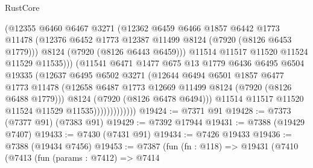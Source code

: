 \begin{lexlean}{RustCore}
\begin{coremodule}
                              (@12355
                                @6460
                                @6467
                                @3271
                                (@12362
                                  @6459
                                  @6466
                                  @1857
                                  @6442
                                  @1773
                                  @11478
                                  (@12376
                                    @6452
                                    @1773
                                    @12387
                                    @11499
                                    @8124
                                    (@7920 (@8126 @6453 @1779)))
                                  @8124
                                  (@7920 (@8126 @6443 @6459)))
                                @11514
                                @11517
                                @11520
                                @11524
                                @11529
                                @11535)))
                          (@11541
                            @6471
                            @1477
                            @675
                            @13
                            @1779
                            @6436
                            @6495
                            @6504
                            @19335
                            (@12637
                              @6495
                              @6502
                              @3271
                              (@12644
                                @6494
                                @6501
                                @1857
                                @6477
                                @1773
                                @11478
                                (@12658 @6487 @1773 @12669 @11499 @8124 (@7920 (@8126 @6488 @1779)))
                                @8124
                                (@7920 (@8126 @6478 @6494)))
                              @11514
                              @11517
                              @11520
                              @11524
                              @11529
                              @11535)))))))))))))
@19424 := @7371 @91
@19428 := @7373 (@7377 @91) (@7383 @91)
@19429 := @7392 @17944
@19431 := @7388 (@19429 @7407)
@19433 := @7430 (@7431 @91)
@19434 := @7426 @19433
@19436 := @7388 (@19434 @7456)
@19453 := @7387
    (fun (fn : @118) =>
    @19431
      (@7410
        (@7413
          (fun (params : @7412) =>
          @7414

\end{coremodule}
\end{lexlean}
